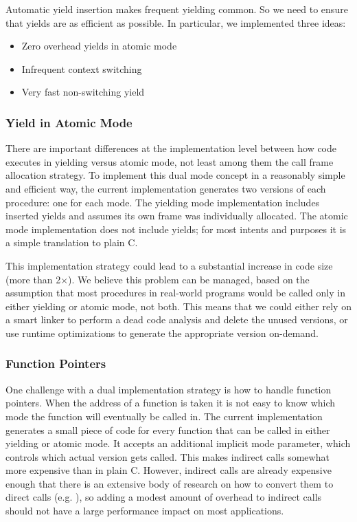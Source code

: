 \documentclass[sigplan,10pt,review,anonymous]{acmart}\settopmatter{printfolios=true,printccs=false,printacmref=false}
\begin{document}
Automatic yield insertion makes frequent yielding common.
So we need to ensure that yields are as efficient as possible.
In particular, we implemented three ideas:

\begin{itemize}
\item Zero overhead yields in atomic mode
\item Infrequent context switching
\item Very fast non-switching yield
\end{itemize}

\subsubsection{Yield in Atomic Mode}

There are important differences at the implementation level between how code executes in yielding versus atomic mode, not least among them the call frame allocation strategy.
To implement this dual mode concept in a reasonably simple and efficient way, the current \charcoal{} implementation generates two versions of each procedure: one for each mode.
The yielding mode implementation includes inserted yields and assumes its own frame was individually allocated.
The atomic mode implementation does not include yields; for most intents and purposes it is a simple translation to plain C.

This implementation strategy could lead to a substantial increase in code size (more than 2$\times$).
We believe this problem can be managed, based on the assumption that most procedures in real-world programs would be called only in either yielding or atomic mode, not both.
This means that we could either rely on a smart linker to perform a dead code analysis and delete the unused versions, or use runtime optimizations to generate the appropriate version on-demand.


\subsubsection{Function Pointers}

One challenge with a dual implementation strategy is how to handle function pointers.
When the address of a function is taken it is not easy to know which mode the function will eventually be called in.
The current implementation generates a small piece of code for every function that can be called in either yielding or atomic mode.
It accepts an additional implicit mode parameter, which controls which actual version gets called.
This makes indirect calls somewhat more expensive than in plain C.
However, indirect calls are already expensive enough that there is an extensive body of research on how to convert them to direct calls (e.g. \cite{Dean1995}), so adding a modest amount of overhead to indirect calls should not have a large performance impact on most applications.
\end{document}
